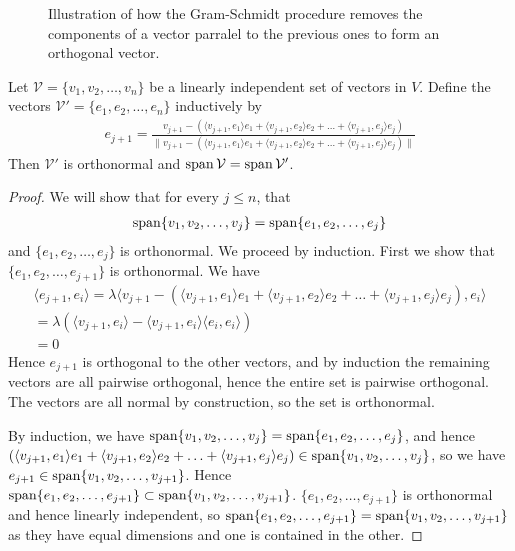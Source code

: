\documentclass[]{article}
\begin{document}
\begin{figure}[ht]
\centering
{}
\caption{Illustration of how the Gram-Schmidt procedure removes the components of a vector parralel to the previous ones to form an orthogonal vector.}
\label{fig:gram-schmidt}
\end{figure}
		
\begin{thm} 
		Let $\mathcal{V} = \{v_1, v_2, \ldots, v_n\}$ be a linearly independent set of vectors in $V$. Define the vectors $\mathcal{V}' = \{e_1, e_2, \ldots, e_n\}$ inductively by
	\begin{align*}
			e_{j+1} = \frac{v_{j+1} - (\langle v_{j+1}, e_1 \rangle e_1 + \langle v_{j+1}, e_2 \rangle e_2 + \ldots + \langle v_{j+1}, e_j \rangle e_j)}{\|v_{j+1} - (\langle v_{j+1}, e_1 \rangle e_1 + \langle v_{j+1}, e_2 \rangle e_2 + \ldots + \langle v_{j+1}, e_j \rangle e_j)\|}
	\end{align*}
	Then $\mathcal{V}'$ is orthonormal and $\operatorname{span} \mathcal{V} = \operatorname{span} \mathcal{V}'$.
\end{thm}

\begin{proof}
		We will show that for every $j \leq n$, that 
		\begin{align*}
		\operatorname{span}\{v_1, v_2, \ldots, v_j\} = \operatorname{span}\{e_1, e_2, \ldots, e_j\}
		\end{align*}
		and $\{e_1, e_2, \ldots, e_j\}$ is orthonormal. We proceed by induction. First we show that $\{e_1, e_2, \ldots, e_{j+1}\}$ is orthonormal. We have
		\begin{align*}
				\langle e_{j+1}, e_i \rangle = \lambda \langle v_{j+1} - (\langle v_{j+1}, e_1 \rangle e_1 + \langle v_{j+1}, e_2 \rangle e_2 + \ldots + \langle v_{j+1}, e_j \rangle e_j), e_i \rangle\\
				= \lambda(\langle v_{j+1}, e_i \rangle - \langle v_{j+1}, e_i \rangle \langle e_i, e_i \rangle ) \\
				= 0
		\end{align*}
		Hence $e_{j+1}$ is orthogonal to the other vectors, and by induction the remaining vectors are all pairwise orthogonal, hence the entire set is pairwise orthogonal. The vectors are all normal by construction, so the set is orthonormal.

		By induction, we have $\operatorname{span}\{v_1, v_2, \ldots, v_j\} = \operatorname{span}\{e_1, e_2, \ldots, e_j\}$, and hence $(\langle v_{j+1}, e_1 \rangle e_1 + \langle v_{j+1}, e_2 \rangle e_2 + \ldots + \langle v_{j+1}, e_j \rangle e_j) \in \operatorname{span}\{v_1, v_2, \ldots, v_j\}$, so we have $e_{j+1} \in \operatorname{span}\{v_1, v_2, \ldots, v_{j+1}\}$. Hence $\operatorname{span}\{e_1, e_2, \ldots, e_{j+1}\} \subset \operatorname{span}\{v_1,v_2, \ldots, v_{j+1}\}$. $\{e_1, e_2, \ldots, e_{j+1}\}$ is orthonormal and hence linearly independent, so $\operatorname{span}\{e_1, e_2, \ldots, e_{j+1}\} = \operatorname{span}\{v_1,v_2, \ldots, v_{j+1}\}$ as they have equal dimensions and one is contained in the other.
\end{proof}
\end{document}
